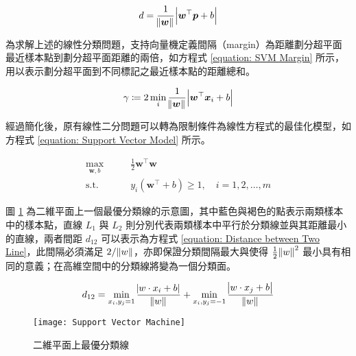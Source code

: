 \begin{equation}\label{equation: Distance Between Plane and Point}
  d = \frac{1}{\norm{\boldsymbol{w}}} \abs{\boldsymbol{w}^{\top} \boldsymbol{p} + b}
\end{equation}

為求解上述的線性分類問題，支持向量機定義間隔（margin）為距離劃分超平面最近樣本點到劃分超平面距離的兩倍，如方程式 \eqref{equation: SVM Margin} 所示，用以表示劃分超平面到不同標記之最近樣本點的距離總和。

\begin{equation}\label{equation: SVM Margin}
  \gamma \coloneqq 2 \min_{i} \frac{1}{\norm{\boldsymbol{w}}} \abs{\boldsymbol{w}^{\top} \boldsymbol{x}_i + b}
\end{equation}

經過簡化後，原有線性二分問題可以轉為限制條件為線性方程式的最佳化模型，如方程式 \eqref{equation: Support Vector Model} 所示。

\begin{equation}\label{equation: Support Vector Model}
  \begin{aligned}
    \max_{\boldsymbol{w}, b} \qquad & \frac{1}{2} \boldsymbol{w}^{\top}\boldsymbol{w} \\
    \text{s.t.}              \qquad & y_i (\boldsymbol{w}^{\top} + b) \geq 1,\quad i = 1, 2, \ldots, m
  \end{aligned}
\end{equation}

圖 \ref{figure: Support Vector Machine} 為二維平面上一個最優分類線的示意圖，其中藍色與褐色的點表示兩類樣本中的樣本點，直線 $L_1$ 與 $L_2$ 則分別代表兩類樣本中平行於分類線並與其距離最小的直線，兩者間距 $d_{12}$ 可以表示為方程式 \eqref{equation: Distance between Two Line}，此間隔必須滿足 $2 / \norm{w}$，亦即保證分類間隔最大與使得 $\frac{1}{2} \norm{w}^2$ 最小具有相同的意義；在高維空間中的分類線將變為一個分類面。

\begin{equation}\label{equation: Distance between Two Line}
  d_{12} = \min_{x_i, y_j = 1} \frac{\abs{w\cdot x_i + b}}{\norm{w}} + \min_{x_i, y_j = -1} \frac{\abs{w\cdot x_j + b}}{\norm{w}}
\end{equation}

\begin{figure}[htbp]
  \centering
  \texttt{[image: Support Vector Machine]}
  \caption[二維平面上最優分類線]{二維平面上最優分類線}
  \label{figure: Support Vector Machine}
\end{figure}

